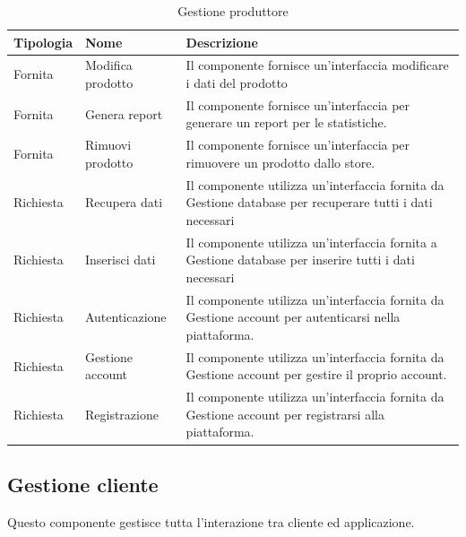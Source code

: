\begin{table}[htbp!]
    \centering
    \begin{tabularx}{0.9\textwidth}{ >{\centering\arraybackslash}X | >{\centering\arraybackslash}X | m{8cm}}
        \hline
        \textbf{Tipologia} & \textbf{Nome}  & \textbf{Descrizione}\\
        \hline
        Fornita & Modifica prodotto & Il componente fornisce un'interfaccia modificare i dati del prodotto \\
        \hline
        Fornita & Genera report & Il componente fornisce un'interfaccia per generare un report per le statistiche.\\
        \hline
        Fornita &  Rimuovi prodotto & Il componente fornisce un'interfaccia per rimuovere un prodotto dallo store.\\
        \hline
        Richiesta &  Recupera dati & Il componente utilizza un'interfaccia fornita da Gestione database per recuperare tutti i dati necessari\\
        \hline
        Richiesta &  Inserisci dati & Il componente utilizza un'interfaccia fornita a Gestione database per inserire tutti i dati necessari\\
        \hline
        Richiesta &  Autenticazione & Il componente utilizza un'interfaccia fornita da Gestione account per autenticarsi nella piattaforma.\\
        \hline        
        Richiesta &  Gestione account & Il componente utilizza un'interfaccia fornita da Gestione account per gestire il proprio account.\\
        \hline
        Richiesta &  Registrazione & Il componente utilizza un'interfaccia fornita da Gestione account per registrarsi alla piattaforma.\\
        \hline
    \end{tabularx}
    \caption{Gestione produttore}
    \label{tab:gestione-produttore}
\end{table}

\newpage
\subsection{Gestione cliente}
Questo componente gestisce tutta l'interazione tra cliente ed applicazione.


